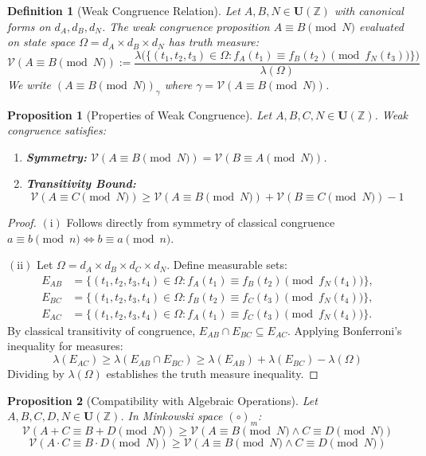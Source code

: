 \documentclass[a4paper,14pt, twoside]{memoir}
\newtheorem{definition}{Definition}[chapter]
\newtheorem{proposition}{Proposition}[chapter]
\newcommand{\tsbd}[1]{\mathbf{U}(\mathbb{#1})}
\newcommand{\ddclmd}{\mathcal{V}} %
\begin{document}
	\begin{definition}[Weak Congruence Relation]
		Let $A, B, N \in \tsbd{Z}$ with canonical forms on $d_A, d_B, d_N$. The weak congruence proposition $A \equiv B \pmod N$ evaluated on state space $\Omega = d_A \times d_B \times d_N$ has truth measure:
		\[
		\ddclmd(A \equiv B \pmod N) := \frac{\lambda\big(\{(t_1, t_2, t_3) \in \Omega : f_A(t_1) \equiv f_B(t_2) \pmod{f_N(t_3)}\}\big)}{\lambda(\Omega)}
		\]
		We write $(A \equiv B \pmod N)_\gamma$ where $\gamma = \ddclmd(A \equiv B \pmod N)$.
	\end{definition}
	
	\begin{proposition}[Properties of Weak Congruence]
		Let $A, B, C, N \in \tsbd{Z}$. Weak congruence satisfies:
		\begin{enumerate}[label=$\mathrm{(\roman*)}$]
			\item \textbf{Symmetry:} $\ddclmd(A \equiv B \pmod N) = \ddclmd(B \equiv A \pmod N)$.
			\item \textbf{Transitivity Bound:} 
			\[
			\ddclmd(A \equiv C \pmod N) \ge \ddclmd(A \equiv B \pmod N) + \ddclmd(B \equiv C \pmod N) - 1
			\]
		\end{enumerate}
	\end{proposition}
	
	\begin{proof}
		$\mathrm{(i)}$ Follows directly from symmetry of classical congruence $a \equiv b \pmod n \iff b \equiv a \pmod n$.
		
		$\mathrm{(ii)}$ Let $\Omega = d_A \times d_B \times d_C \times d_N$. Define measurable sets:
		\begin{align*}
			E_{AB} &= \{(t_1, t_2, t_3, t_4) \in \Omega : f_A(t_1) \equiv f_B(t_2) \pmod{f_N(t_4)}\}, \\
			E_{BC} &= \{(t_1, t_2, t_3, t_4) \in \Omega : f_B(t_2) \equiv f_C(t_3) \pmod{f_N(t_4)}\}, \\
			E_{AC} &= \{(t_1, t_2, t_3, t_4) \in \Omega : f_A(t_1) \equiv f_C(t_3) \pmod{f_N(t_4)}\}.
		\end{align*}
		By classical transitivity of congruence, $E_{AB} \cap E_{BC} \subseteq E_{AC}$. Applying Bonferroni's inequality for measures:
		\[
		\lambda(E_{AC}) \ge \lambda(E_{AB} \cap E_{BC}) \ge \lambda(E_{AB}) + \lambda(E_{BC}) - \lambda(\Omega)
		\]
		Dividing by $\lambda(\Omega)$ establishes the truth measure inequality.
	\end{proof}
	
	\begin{proposition}[Compatibility with Algebraic Operations]
		Let $A, B, C, D, N \in \tsbd{Z}$. In Minkowski space $(\circ)_m$:
		\[
		\ddclmd(A + C \equiv B + D \pmod N) \ge \ddclmd(A \equiv B \pmod N \land C \equiv D \pmod N)
		\]
		\[
		\ddclmd(A \cdot C \equiv B \cdot D \pmod N) \ge \ddclmd(A \equiv B \pmod N \land C \equiv D \pmod N)
		\]
	\end{proposition}
	
\end{document}
